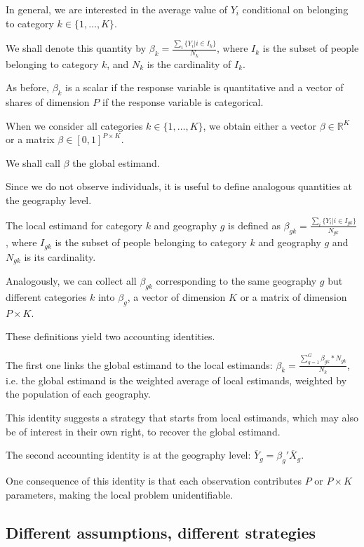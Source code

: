 In general, we are interested in the average value of $Y_i$ conditional on belonging to category $k \in \{1,\ldots,K\}$.

We shall denote this quantity by $\beta_k = \frac{\sum_i \{Y_i|i \in I_k\}}{N_k}$, where $I_k$ is the subset of people belonging to category $k$, and $N_k$ is the cardinality of $I_k$.

As before, $\beta_k$ is a scalar if the response variable is quantitative and a vector of shares of dimension $P$ if the response variable is categorical.

When we consider all categories $k \in \{1,\ldots,K\}$, we obtain either a vector $\beta \in \mathbb{R}^K$ or a matrix $\beta \in [0,1]^{P\times K}$.

We shall call $\beta$ the global estimand.

Since we do not observe individuals, it is useful to define analogous quantities at the geography level.

The local estimand for category $k$ and geography $g$ is defined as $\beta_{gk} = \frac{\sum_i \{Y_i|i \in I_{gk}\}}{N_{gk}}$, where $I_{gk}$ is the subset of people belonging to category $k$ and geography $g$ and $N_{gk}$ is its cardinality.

Analogously, we can collect all $\beta_{gk}$ corresponding to the same geography $g$ but different categories $k$ into $\beta_g$, a vector of dimension $K$ or a matrix of dimension $P \times K$.

These definitions yield two accounting identities.

The first one links the global estimand to the local estimands: $\beta_k = \frac{\sum_{g=1}^{G} \beta_{gk}*N_{gk}}{N_k}$, i.e. the global estimand is the weighted average of local estimands, weighted by the population of each geography.

This identity suggests a strategy that starts from local estimands, which may also be of interest in their own right, to recover the global estimand.

The second accounting identity is at the geography level: $\overline{Y}_g = \beta_g'\overline{X}_g$.

One consequence of this identity is that each observation contributes $P$ or $P \times K$ parameters, making the local problem unidentifiable.

\subsection{Different assumptions, different strategies}

